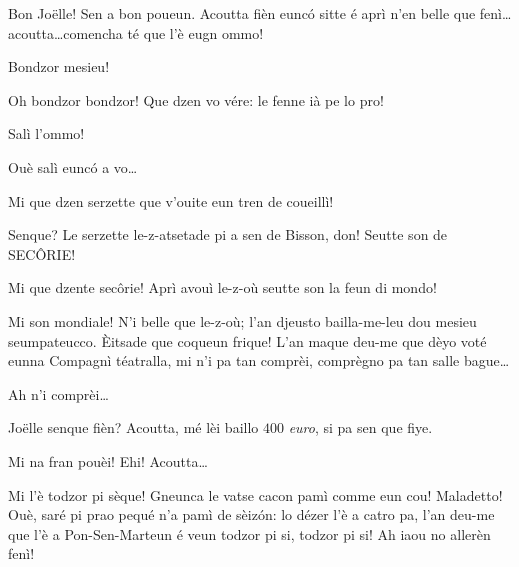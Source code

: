 \begin{drama}



\Dallasspeaks Bon Jo\"{e}lle! Sen a bon poueun. Acoutta fièn eunc\'o sitte  é aprì n'en belle que fenì\ldots acoutta\ldots comencha té que l'è eugn ommo!


\Joellespeaks Bondzor mesieu!

\Pompiolenspeaks Oh bondzor bondzor! Que dzen vo vére: le fenne ià pe lo pro!

\Dallasspeaks Salì l'ommo!

\Pompiolenspeaks Ouè salì eunc\'o a vo\ldots

\Dallasspeaks Mi que dzen serzette que v'ouite eun tren de coueillì!


\Pompiolenspeaks{} Senque? Le serzette le-z-atsetade pi a sen de Bisson, don! Seutte son de SEC\^ORIE!


\Joellespeaks  Mi que dzente sec\^orie! Aprì avouì le-z-où seutte son la feun di mondo! 

\Pompiolenspeaks Mi son mondiale! N’i belle que le-z-où; l'an djeusto bailla-me-leu dou mesieu seumpateucco. \`Eitsade que coqueun frique!   L'an maque deu-me que dèyo voté eunna Compagnì téatralla, mi n'i pa tan comprèi, comprègno pa tan salle bague\ldots

\Joellespeaks{} Ah n'i comprèi\ldots


\Dallasspeaks Jo\"{e}lle senque fièn? Acoutta, mé lèi baillo $400$ \textit{euro}, si pa sen que fiye.

\Joellespeaks Mi na fran pouèi! Ehi!  Acoutta\ldots

\Pompiolenspeaks Mi l'è todzor pi sèque! Gneunca le vatse cacon pamì comme eun cou! Maladetto! Ouè, saré pi prao pequé n'a pamì de sèiz\'on: lo dézer l'è a catro pa, l'an deu-me que l'è a Pon-Sen-Marteun é veun todzor pi si, todzor pi si! Ah iaou no allerèn fenì!


\end{drama}
